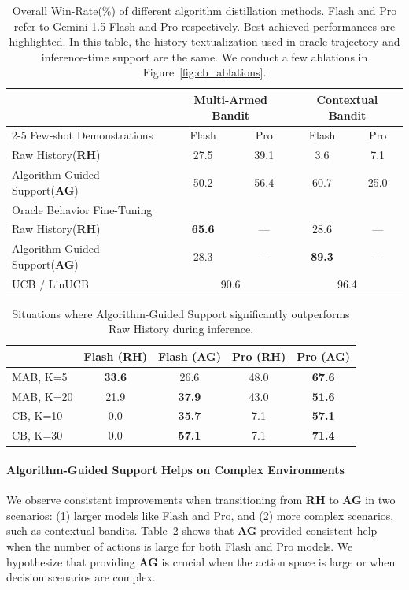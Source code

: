 \documentclass[11pt, logo]{googledeepmind}
\newcommand{\RH}{\textbf{RH}\xspace}
\newcommand{\AG}{\textbf{AG}\xspace}
\newcommand{\AWR}{Overall Win-Rate\xspace}
\newcommand{\ag}{Algorithm-Guided Support\xspace}
\newcommand{\rah}{Raw History\xspace}
\newcommand{\oft}{Oracle Behavior Fine-Tuning\xspace}
\newcommand{\ad}{algorithm distillation\xspace}
\theoremstyle{plain}
\theoremstyle{definition}
\begin{document}
\begin{table}[]
\small
\centering
\begin{tabular}{@{}lcc|cc@{}}
\toprule
 & \multicolumn{2}{c}{\textbf{Multi-Armed Bandit}} & \multicolumn{2}{c}{\textbf{Contextual Bandit}} \\ \cmidrule(l){2-5}
 Few-shot Demonstrations                         & Flash   & Pro  & Flash   & Pro   \\ \midrule
\rah (\RH)                & 27.5              & 39.1           & 3.6                 & 7.1            \\
\ag (\AG)         & 50.2              & 56.4           & 60.7              & 25.0           \\ \midrule
\oft  \\  \midrule
\rah (\RH) & \textbf{65.6} & --- & 28.6 & --- \\
\ag (\AG) & 28.3 & --- & \textbf{89.3} & --- \\ \midrule
UCB / LinUCB & \multicolumn{2}{c|}{90.6} & \multicolumn{2}{c}{96.4}  \\
\bottomrule
\end{tabular}
\caption{\footnotesize{\AWR (\%) of different \ad methods. Flash and Pro refer to Gemini-1.5 Flash and Pro respectively. Best achieved performances are highlighted. In this table, the history textualization used in oracle trajectory and inference-time support are the same. We conduct a few ablations in Figure~\ref{fig:cb_ablations}.}}
\label{tab:training_time_algs}
\end{table}
\begin{table}[h]
\small
\centering
\begin{tabular}{@{}lcccc@{}}
\toprule
     & Flash (\RH) & Flash (\AG) & Pro (\RH) & Pro (\AG) \\ \midrule
MAB, K=5  & \textbf{33.6}     & 26.6     & 48.0   & \textbf{67.6}   \\
MAB, K=20 & 21.9     & \textbf{37.9}     & 43.0   & \textbf{51.6}   \\ \midrule
CB, K=10 & 0.0 & \textbf{35.7} & 7.1 & \textbf{57.1} \\
CB, K=30 & 0.0 & \textbf{57.1} & 7.1 & \textbf{71.4} \\
\bottomrule
\end{tabular}
\caption{\footnotesize{Situations where \ag significantly outperforms \rah during inference.}}
\label{tab:ag_helped}
\vspace{-0.5cm}
\end{table}
\paragraph{\ag Helps on Complex Environments}
We observe consistent improvements when transitioning from \RH to \AG in two scenarios: (1) larger models like Flash and Pro, and (2) more complex scenarios, such as contextual bandits. Table~\ref{tab:ag_helped} shows that \AG provided consistent help when the number of actions is large for both Flash and Pro models. We hypothesize that providing \AG is crucial when the action space is large or when decision scenarios are complex.
\end{document}
